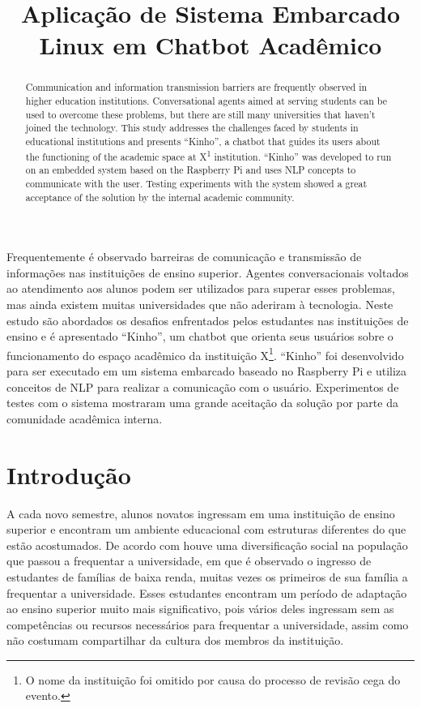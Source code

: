 \documentclass[12pt]{article}
\title{Aplicação de Sistema Embarcado Linux em Chatbot Acadêmico}
\begin{document}
 

\maketitle

\begin{abstract}
Communication and information transmission barriers are frequently observed in higher education institutions. Conversational agents aimed at serving students can be used to overcome these problems, but there are still many universities that haven't joined the technology. This study addresses the challenges faced by students in educational institutions and presents “Kinho”, a chatbot that guides its users about the functioning of the academic space at X\textsuperscript{1} institution. “Kinho” was developed to run on an embedded system based on the Raspberry Pi and uses NLP concepts to communicate with the user. Testing experiments with the system showed a great acceptance of the solution by the internal academic community.
\end{abstract}
     
\begin{resumo} 
Frequentemente é observado barreiras de comunicação e transmissão de informações nas instituições de ensino superior. Agentes conversacionais voltados ao atendimento aos alunos podem ser utilizados para superar esses problemas, mas ainda existem muitas universidades que não aderiram à tecnologia. Neste estudo são abordados os desafios enfrentados pelos estudantes nas instituições de ensino e é apresentado “Kinho”, um chatbot que orienta seus usuários sobre o funcionamento do espaço acadêmico da instituição X\footnote{O nome da instituição foi omitido por causa do processo de revisão cega do evento.}. “Kinho” foi desenvolvido para ser executado em um sistema embarcado baseado no Raspberry Pi e utiliza conceitos de NLP para realizar a comunicação com o usuário. Experimentos de testes com o sistema mostraram uma grande aceitação da solução por parte da comunidade acadêmica interna.
\end{resumo}


\section{Introdução}

A cada novo semestre, alunos novatos ingressam em uma instituição de ensino superior e encontram um ambiente educacional com estruturas diferentes do que estão acostumados. De acordo com \cite{torres:21} houve uma diversificação social na população que passou a frequentar a universidade, em que é observado o ingresso de estudantes de famílias de baixa renda, muitas vezes os primeiros de sua família a frequentar a universidade. Esses estudantes encontram um período de adaptação ao ensino superior muito mais significativo, pois vários deles ingressam sem as competências ou recursos necessários para frequentar a universidade, assim como não costumam compartilhar da cultura dos membros da instituição. 
\end{document}
